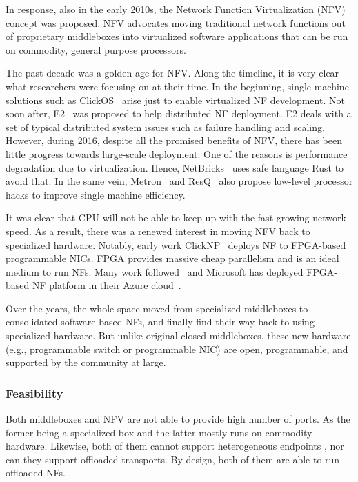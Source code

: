 In response, also in the early 2010s,
the Network Function Virtualization (NFV) concept was proposed.
NFV advocates moving traditional network functions out of
proprietary middleboxes into virtualized software applications
that can be run on commodity, general purpose processors.

The past decade was a golden age for NFV.
Along the timeline, it is very clear what researchers were
focusing on at their time.
In the beginning, single-machine solutions such as ClickOS~\cite{clickos-nsdi14} arise just to enable virtualized
NF development. Not soon after, E2~\cite{e2} was proposed
to help distributed NF deployment. E2 deals with a set of typical
distributed system issues such as failure handling and scaling.
However, during 2016, despite all the promised benefits of NFV,
there has been little progress towards large-scale deployment.
One of the reasons is performance degradation due to virtualization.
Hence, NetBricks~\cite{netbricks} uses safe language Rust to avoid that.
In the same vein, Metron~\cite{metron-nsdi18} and ResQ~\cite{resq-nsdi18}
also propose low-level processor hacks to improve single machine efficiency.

It was clear that CPU will not be able to keep up with the
fast growing network speed.
As a result, there was a renewed interest in moving NFV
back to specialized hardware.
Notably, early work ClickNP~\cite{clickos-nsdi14} deploys NF to
FPGA-based programmable NICs.
FPGA provides massive cheap parallelism and is an ideal medium to run NFs.
Many work followed~\cite{flowblaze-nsdi19,panic-osdi20} and Microsoft
has deployed FPGA-based NF platform in their Azure cloud~\cite{azure-nsdi18}.

Over the years, the whole space moved from specialized middleboxes
to consolidated software-based NFs, and finally find their
way back to using specialized hardware.
But unlike original closed middleboxes, these new hardware (e.g., programmable switch or programmable NIC) are open, programmable,
and supported by the community at large.

\subsubsection{Feasibility}

Both middleboxes and NFV are not able to provide
high number of ports. As the former being a specialized box
and the latter mostly runs on commodity hardware.
Likewise, both of them cannot support heterogeneous endpoints
, nor can they support offloaded transports.
By design, both of them are able to run offloaded NFs. 

